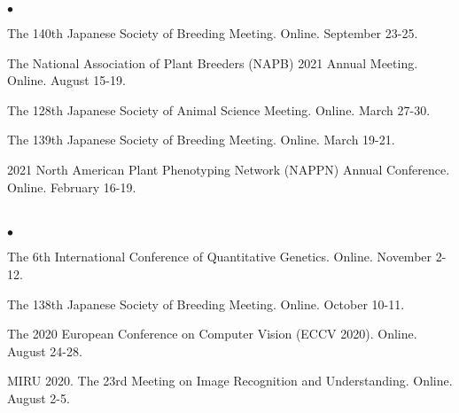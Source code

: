 \documentclass[margin,line,10pt]{res}
\newenvironment{list2}{
  \begin{list}{$\bullet$}{%
      \setlength{\itemsep}{0in}
      \setlength{\parsep}{0in} \setlength{\parskip}{0in}
      \setlength{\topsep}{0in} \setlength{\partopsep}{0in} 
      \setlength{\leftmargin}{0.2in}}}{\end{list}}
\begin{document}
\begin{resume}
\begin{list2}
 
  
\item The 140th Japanese Society of Breeding Meeting. Online. September 23-25.  

   \vspace{0.5cm}

   \item  The National Association of Plant Breeders (NAPB) 2021 Annual Meeting. Online. August 15-19.
  
     \vspace{0.5cm}

\item  The 128th Japanese Society of Animal Science Meeting. Online. March 27-30.
  
  \vspace{0.5cm}
  
\item The 139th Japanese Society of Breeding Meeting. Online. March 19-21.  

    \vspace{0.5cm}

  \item 2021 North American Plant Phenotyping Network (NAPPN) Annual Conference. Online. February 16-19.  
  
\end{list2}

  
\section{}
\begin{list2}


\item  The 6th International Conference of Quantitative Genetics. Online. November 2-12. 

  \vspace{0.5cm}

  
  \item The 138th Japanese Society of Breeding Meeting. Online. October 10-11.  

    \vspace{0.5cm}
    
\item The 2020 European Conference on Computer Vision (ECCV 2020). Online. August 24-28.  

      \vspace{0.5cm}

\item MIRU 2020. The 23rd Meeting on Image Recognition and Understanding. Online. August 2-5. 


\end{list2}
\end{resume}
\end{document}
